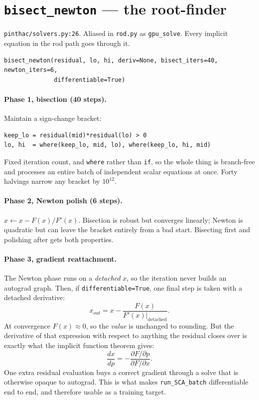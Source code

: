 \documentclass[11pt]{article}
\newcommand{\code}[1]{\texttt{#1}}
\begin{document}
\section{\code{bisect\_newton} --- the root-finder}
\label{sec:solver}
\code{pinthac/solvers.py:26}. Aliased in \code{rod.py} as \code{gpu\_solve}. Every
implicit equation in the rod path goes through it.

\begin{lstlisting}
bisect_newton(residual, lo, hi, deriv=None, bisect_iters=40, newton_iters=6,
              differentiable=True)
\end{lstlisting}

\paragraph{Phase 1, bisection (40 steps).} Maintain a sign-change bracket:
\begin{lstlisting}
keep_lo = residual(mid)*residual(lo) > 0
lo, hi  = where(keep_lo, mid, lo), where(keep_lo, hi, mid)
\end{lstlisting}
Fixed iteration count, and \code{where} rather than \code{if}, so the whole thing is
branch-free and processes an entire batch of independent scalar equations at once. Forty
halvings narrow any bracket by $10^{12}$.

\paragraph{Phase 2, Newton polish (6 steps).} $x \leftarrow x - F(x)/F'(x)$. Bisection is
robust but converges linearly; Newton is quadratic but can leave the bracket entirely from
a bad start. Bisecting first and polishing after gets both properties.

\paragraph{Phase 3, gradient reattachment.} The Newton phase runs on a \emph{detached}
$x$, so the iteration never builds an autograd graph. Then, if
\code{differentiable=True}, one final step is taken with a detached derivative:
\begin{equation}
x_{out} = x - \frac{F(x)}{F'(x)\big|_{\text{detached}}}.
\end{equation}
At convergence $F(x) \approx 0$, so the \emph{value} is unchanged to rounding. But the
derivative of that expression with respect to anything the residual closes over is
exactly what the implicit function theorem gives:
\begin{equation}
\frac{dx}{dp} = -\frac{\partial F/\partial p}{\partial F/\partial x}.
\end{equation}
One extra residual evaluation buys a correct gradient through a solve that is otherwise
opaque to autograd. This is what makes \code{run\_SCA\_batch} differentiable end to end,
and therefore usable as a training target.
\end{document}
